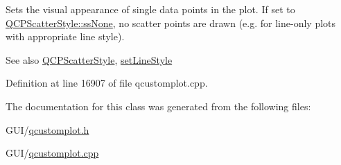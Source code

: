 Sets the visual appearance of single data points in the plot. If set to \hyperlink{class_q_c_p_scatter_style_adb31525af6b680e6f1b7472e43859349abd144c291ca274f77053ec68cab6c022}{Q\+C\+P\+Scatter\+Style\+::ss\+None}, no scatter points are drawn (e.\+g. for line-\/only plots with appropriate line style).

\begin{DoxySeeAlso}{See also}
\hyperlink{class_q_c_p_scatter_style}{Q\+C\+P\+Scatter\+Style}, \hyperlink{class_q_c_p_curve_a4a377ec863ff81a1875c3094a6177c19}{set\+Line\+Style} 
\end{DoxySeeAlso}


Definition at line 16907 of file qcustomplot.\+cpp.



The documentation for this class was generated from the following files\+:\begin{DoxyCompactItemize}
\item 
G\+U\+I/\hyperlink{qcustomplot_8h}{qcustomplot.\+h}\item 
G\+U\+I/\hyperlink{qcustomplot_8cpp}{qcustomplot.\+cpp}\end{DoxyCompactItemize}
